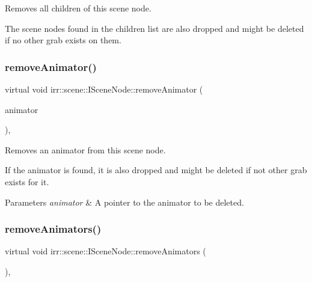 Removes all children of this scene node. 

The scene nodes found in the children list are also dropped and might be deleted if no other grab exists on them. \mbox{\label{classirr_1_1scene_1_1ISceneNode_aaa67f8f91d4ec99f82955641f1f9e521}} 
\subsubsection{\texorpdfstring{remove\+Animator()}{removeAnimator()}}
{\footnotesize\ttfamily virtual void irr\+::scene\+::\+I\+Scene\+Node\+::remove\+Animator (\begin{DoxyParamCaption}\item[{\hyperlink{classirr_1_1scene_1_1ISceneNodeAnimator}{I\+Scene\+Node\+Animator} $\ast$}]{animator }\end{DoxyParamCaption})\hspace{0.3cm}{\ttfamily [inline]}, {\ttfamily [virtual]}}



Removes an animator from this scene node. 

If the animator is found, it is also dropped and might be deleted if not other grab exists for it. 
\begin{DoxyParams}{Parameters}
{\em animator} & A pointer to the animator to be deleted. \\
\hline
\end{DoxyParams}
\mbox{\label{classirr_1_1scene_1_1ISceneNode_a28f198bd566e9a7290cbefa531d8d31e}} 
\subsubsection{\texorpdfstring{remove\+Animators()}{removeAnimators()}}
{\footnotesize\ttfamily virtual void irr\+::scene\+::\+I\+Scene\+Node\+::remove\+Animators (\begin{DoxyParamCaption}{ }\end{DoxyParamCaption})\hspace{0.3cm}{\ttfamily [inline]}, {\ttfamily [virtual]}}



